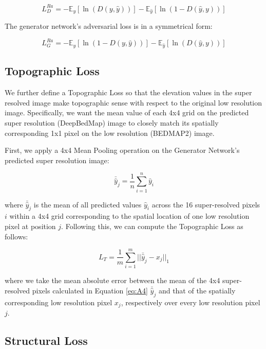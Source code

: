 \documentclass[tc, manuscript]{copernicus}
\begin{document}
\begin{equation}\label{eq:A2}
  L_D^{Ra} = - \mathbb{E}_y[\ln(D(y,\hat{y}))] - \mathbb{E}_{\hat{y}}[\ln(1 - D(\hat{y},y))]
\end{equation}

The generator network's adversarial loss is in a symmetrical form:

\begin{equation}\label{eq:A3}
  L_G^{Ra} = - \mathbb{E}_y[\ln(1 - D(y,\hat{y}))] - \mathbb{E}_{\hat{y}}[\ln(D(\hat{y},y))]
\end{equation}

\subsection{Topographic Loss}

We further define a Topographic Loss so that the elevation values in the super resolved image make topographic sense with respect to the original low resolution image.
Specifically, we want the mean value of each 4x4 grid on the predicted super resolution (DeepBedMap) image to closely match its spatially corresponding 1x1 pixel on the low resolution (BEDMAP2) image.

First, we apply a 4x4 Mean Pooling operation on the Generator Network's predicted super resolution image:

\begin{equation}\label{eq:A4}
 \bar{\hat{y}}_j = \dfrac{1}{n} \sum\limits_{i=1}^n \hat{y}_i
\end{equation}

where $\bar{\hat{y}}_j$ is the mean of all predicted values $\hat{y}_i$ across the 16 super-resolved pixels $i$ within a 4x4 grid corresponding to the spatial location of one low resolution pixel at position $j$.
Following this, we can compute the Topographic Loss as follows:

\begin{equation}\label{eq:A5}
  L_T = \dfrac{1}{m} \sum\limits_{i=1}^m ||\bar{\hat{y}}_j - x_j||_{1}
\end{equation}

where we take the mean absolute error between the mean of the 4x4 super-resolved pixels calculated in Equation \eqref{eq:A4} $\bar{\hat{y}}_j$ and that of the spatially corresponding low resolution pixel $x_j$, respectively over every low resolution pixel $j$.

\subsection{Structural Loss}
\end{document}
